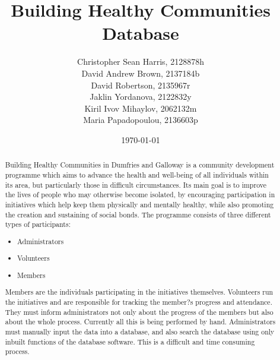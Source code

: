 \documentclass{l3proj}
\begin{document}
\title{Building Healthy Communities Database}

\author{
Christopher Sean Harris, 2128878h \\
David Andrew Brown, 2137184b \\
David Robertson, 2135967r \\
Jaklin Yordanova, 2122832y \\
Kiril Ivov Mihaylov, 2062132m \\
Maria Papadopoulou, 2136603p}

\date{\today}

\maketitle

\begin{abstract}

Building Healthy Communities in Dumfries and Galloway is a community development programme which aims to advance the health and well-being of all individuals within its area, but particularly those in difficult circumstances. Its main goal is to improve the lives of people who may otherwise become isolated, by encouraging participation in initiatives which help keep them physically and mentally healthy, while also promoting the creation and sustaining of social bonds. The programme consists of three different types of participants:
\begin{itemize}
	\item Administrators
	\item Volunteers
	\item Members
\end{itemize}
Members are the individuals participating in the initiatives themselves. Volunteers run the initiatives and are responsible for tracking the member?s progress and attendance. They must inform administrators not only about the progress of the members but also about the whole process. Currently all this is being performed by hand. Administrators must manually input the data into a database, and also search the database using only inbuilt functions of the database software. This is a difficult and time consuming process.


\end{abstract}
\end{document}
